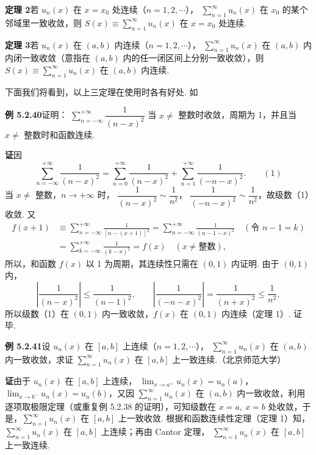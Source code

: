 \documentclass[UTF8, 12pt, fontset=fandol, oneside]{ctexart}
\begin{document}
\noindent\textbf{定理 2}\quad 若 $u_n(x)$ 在 $x=x_0$ 处连续（$n=1,2,\cdots$），
$\displaystyle\sum_{n=1}^{\infty}u_n(x)$ 在 $x_0$ 的某个邻域里一致收敛，则
$S(x)\equiv\displaystyle\sum_{n=1}^{\infty}u_n(x)$ 在 $x=x_0$ 处连续.

\noindent\textbf{定理 3}\quad 若 $u_n(x)$ 在 $(a,b)$ 内连续（$n=1,2,\cdots$），
$\displaystyle\sum_{n=1}^{\infty}u_n(x)$ 在 $(a,b)$ 内内闭一致收敛（意指在
$(a,b)$ 内的任一闭区间上分别一致收敛），则
$S(x)\equiv\displaystyle\sum_{n=1}^{\infty}u_n(x)$ 在 $(a,b)$ 内连续.

下面我们将看到，以上三定理在使用时各有好处. 如

\noindent\textbf{例 5.2.40}\quad 证明：
$\displaystyle\sum_{n=-\infty}^{+\infty}\dfrac1{(n-x)^2}$ 当 $x\ne$ 整数时收敛，周期为
1，并且当 $x\ne$ 整数时和函数连续.

\noindent\textbf{证}\quad 因
\[
  \sum_{n=-\infty}^{+\infty}\frac1{(n-x)^2}
  =\sum_{n=0}^{+\infty}\frac1{(n-x)^2}
  +\sum_{n=1}^{+\infty}\frac1{(-n-x)^2}.
\qquad(1)
\]
当 $x\ne$ 整数，$n\to+\infty$ 时，
$\dfrac1{(n-x)^2}\sim\dfrac1{n^2}$，
$\dfrac1{(-n-x)^2}\sim\dfrac1{n^2}$，故级数（1）收敛. 又
\[
\begin{aligned}
  f(x+1)
  &\equiv \sum_{n=-\infty}^{+\infty}\frac1{[n-(x+1)]^2}
  =\sum_{n=-\infty}^{+\infty}\frac1{(n-1-x)^2}\quad(\text{令 }n-1=k)\\
  &=\sum_{k=-\infty}^{+\infty}\frac1{(k-x)^2}=f(x)\quad(x\ne\text{整数}),
\end{aligned}
\]
所以，和函数 $f(x)$ 以 1 为周期，其连续性只需在 $(0,1)$ 内证明. 由于 $(0,1)$ 内，
\[
  \left|\frac1{(n-x)^2}\right|\le\frac1{(n-1)^2},\qquad
  \left|\frac1{(-n-x)^2}\right|=\frac1{(n+x)^2}\le\frac1{n^2},
\]
所以级数（1）在 $(0,1)$ 内一致收敛，$f(x)$ 在 $(0,1)$ 内连续（定理 1）. 证毕.

\noindent\textbf{例 5.2.41}\quad 设 $u_n(x)$ 在 $[a,b]$ 上连续（$n=1,2,\cdots$），
$\displaystyle\sum_{n=1}^{\infty}u_n(x)$ 在 $(a,b)$ 内一致收敛，求证
$\displaystyle\sum_{n=1}^{\infty}u_n(x)$ 在 $[a,b]$ 上一致连续.（北京师范大学）

\noindent\textbf{证}\quad 由于 $u_n(x)$ 在 $[a,b]$ 上连续，
$\displaystyle\lim_{x\to a^+}u_n(x)=u_n(a)$，
$\displaystyle\lim_{x\to b^-}u_n(x)=u_n(b)$，又因
$\displaystyle\sum_{n=1}^{\infty}u_n(x)$ 在 $(a,b)$ 内一致收敛，利用逐项取极限定理（或重复例 5.2.38 的证明），可知级数在
$x=a,\ x=b$ 处收敛，于是，$\displaystyle\sum_{n=1}^{\infty}u_n(x)$ 在
$[a,b]$ 上一致收敛. 根据和函数连续性定理（定理 1）知，
$\displaystyle\sum_{n=1}^{\infty}u_n(x)$ 在 $[a,b]$ 上连续；再由 Cantor 定理，
$\displaystyle\sum_{n=1}^{\infty}u_n(x)$ 在 $[a,b]$ 上一致连续.
\end{document}
